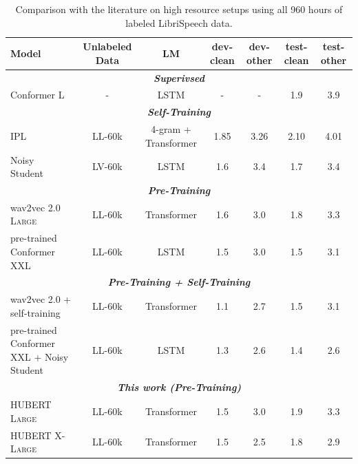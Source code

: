 

\begin{table}[t]
    \centering
    \begin{tabular}{lcccccc}
        \toprule
        Model & Unlabeled Data & LM & dev-clean & dev-other & test-clean & test-other \\
        \midrule\midrule
        \multicolumn{7}{c}{\textit{\textbf{Superivsed}}} \\
        Conformer L~\cite{gulati2020conformer} & - & LSTM & - & - & 1.9 & 3.9 \\
        
        \midrule\midrule
        \multicolumn{7}{c}{\textit{\textbf{Self-Training}}} \\
        IPL~\cite{xu2020iterative} & LL-60k & 4-gram + Transformer & 1.85 & 3.26 & 2.10 & 4.01 \\
        Noisy Student~\cite{park2020improved} & LV-60k & LSTM & 1.6 & 3.4 & 1.7 & 3.4 \\
        
        \midrule\midrule
        \multicolumn{7}{c}{\textit{\textbf{Pre-Training}}} \\
        wav2vec 2.0 \textsc{Large}~\cite{baevski2020wav2vec} & LL-60k & Transformer & 1.6 & 3.0 & 1.8 & 3.3 \\
        pre-trained Conformer XXL~\cite{zhang2020pushing} & LL-60k & LSTM & 1.5 & 3.0 & 1.5 & 3.1 \\
        
        \midrule\midrule
        \multicolumn{7}{c}{\textit{\textbf{Pre-Training + Self-Training}}} \\
        wav2vec 2.0 + self-training~\cite{xu2020self} & LL-60k & Transformer & 1.1 & 2.7 & 1.5 & 3.1\\
        pre-trained Conformer XXL + Noisy Student~\cite{zhang2020pushing} & LL-60k & LSTM & 1.3 & 2.6 & 1.4 & 2.6 \\
        
        \midrule\midrule
        \multicolumn{7}{c}{\textit{\textbf{This work (Pre-Training)}}} \\
        HUBERT \textsc{Large}   & LL-60k & Transformer & 1.5 & 3.0 & 1.9 & 3.3 \\
        HUBERT \textsc{X-Large} & LL-60k & Transformer & 1.5 & 2.5 & 1.8 & 2.9 \\
        
        \bottomrule
    \end{tabular}
    \caption{Comparison with the literature on high resource setups using all 960 hours of labeled LibriSpeech data.}
    \label{tab:main_hi}
\end{table}

